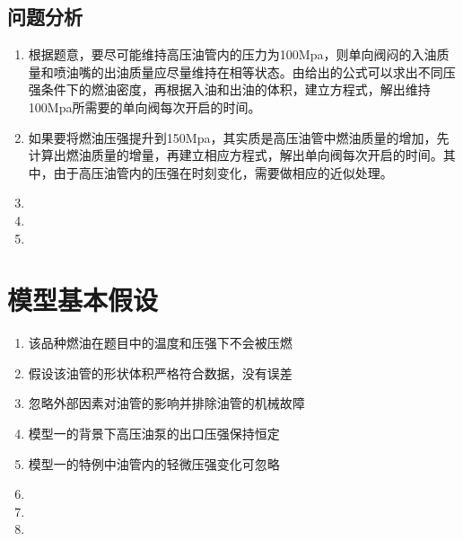 \documentclass{cumcmthesis}
\begin{document}
\subsection{问题分析}
\begin{enumerate}[label=\Roman*.]
	\item 根据题意，要尽可能维持高压油管内的压力为100Mpa，则单向阀闷的入油质量和喷油嘴的出油质量应尽量维持在相等状态。由给出的公式可以求出不同压强条件下的燃油密度，再根据入油和出油的体积，建立方程式，解出维持100Mpa所需要的单向阀每次开启的时间。
	\item 如果要将燃油压强提升到150Mpa，其实质是高压油管中燃油质量的增加，先计算出燃油质量的增量，再建立相应方程式，解出单向阀每次开启的时间。其中，由于高压油管内的压强在时刻变化，需要做相应的近似处理。
	\item
	\item
	\item
\end{enumerate}
\section{模型基本假设}
\begin{enumerate}
	\item 该品种燃油在题目中的温度和压强下不会被压燃
	\item 假设该油管的形状体积严格符合数据，没有误差
	\item 忽略外部因素对油管的影响并排除油管的机械故障
	\item 模型一的背景下高压油泵的出口压强保持恒定
	\item 模型一的特例中油管内的轻微压强变化可忽略
	\item
	\item
	\item
\end{enumerate}
\end{document}

